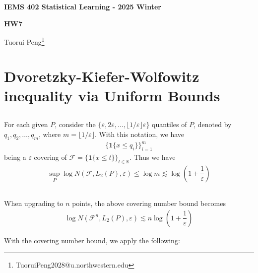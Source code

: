 \documentclass[11pt,a4paper]{ctexart}
\numberwithin{equation}{section}%
\begin{document}
\begin{center}\thispagestyle{plain}

{\LARGE\textbf{IEMS 402 Statistical Learning - 2025 Winter}}

{\Large\textbf{HW7}}

Tuorui Peng\footnote{TuoruiPeng2028@u.northwestern.edu}
\end{center}

\thispagestyle{myheadings}
\pagestyle{myheadings}



\section{Dvoretzky-Kiefer-Wolfowitz inequality via Uniform Bounds}


\subsection{}

For each given $ P $, consider the $ \{\varepsilon ,2\varepsilon ,\ldots, \lfloor 1/\varepsilon \rfloor \varepsilon \}  $ quantiles of $ P $, denoted by $ q_1, q_2, \ldots, q_m $, where $ m = \lfloor 1/\varepsilon \rfloor $. With this notation, we have
\begin{align*}
    \{ \mathbf{1}\{x\leq q_i\} \}_{i=1}^m 
\end{align*}
being a $ \varepsilon  $ covering of $ \mathcal{F}=\{ \mathbf{1}\{x\leq t\} \}_{t\in\mathbb{R}} $. Thus we have
\begin{align*}
    \sup_{P}\log N(\mathcal{F}, L_2(P), \varepsilon ) \leq \log m \lesssim \log (1+\dfrac{ 1 }{ \varepsilon  } )
\end{align*}


\subsection{}

When upgrading to $ n $ points, the above covering number bound becomes
\begin{align*}
    \log N(\mathcal{F}^n, L_2(P), \varepsilon ) \lesssim n\log (1+\dfrac{ 1 }{ \varepsilon  } ) 
\end{align*}



With the covering number bound, we apply the following:
\end{document}
